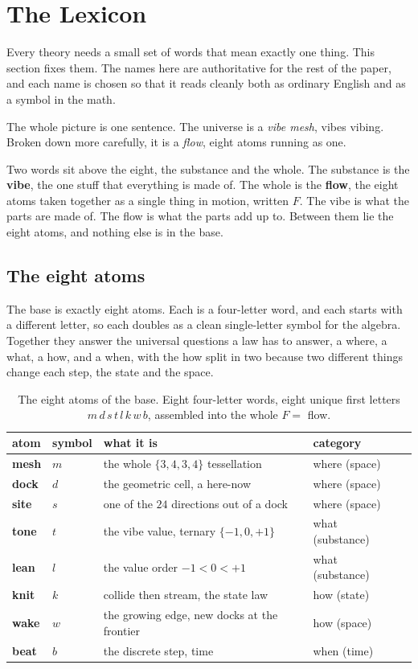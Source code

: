 \section{The Lexicon}

Every theory needs a small set of words that mean exactly one thing. This section fixes them. The names here are authoritative for the rest of the paper, and each name is chosen so that it reads cleanly both as ordinary English and as a symbol in the math.

The whole picture is one sentence. The universe is a \emph{vibe mesh}, vibes vibing. Broken down more carefully, it is a \emph{flow}, eight atoms running as one.

Two words sit above the eight, the substance and the whole. The substance is the \textbf{vibe}, the one stuff that everything is made of. The whole is the \textbf{flow}, the eight atoms taken together as a single thing in motion, written $F$. The vibe is what the parts are made of. The flow is what the parts add up to. Between them lie the eight atoms, and nothing else is in the base.

\subsection{The eight atoms}

The base is exactly eight atoms. Each is a four-letter word, and each starts with a different letter, so each doubles as a clean single-letter symbol for the algebra. Together they answer the universal questions a law has to answer, a where, a what, a how, and a when, with the how split in two because two different things change each step, the state and the space.

\begin{table}[ht]
\centering
\begin{tabular}{@{}lllll@{}}
\toprule
atom & symbol & what it is & category \\
\midrule
\textbf{mesh} & $m$ & the whole $\{3,4,3,4\}$ tessellation & where (space) \\
\textbf{dock} & $d$ & the geometric cell, a here-now & where (space) \\
\textbf{site} & $s$ & one of the $24$ directions out of a dock & where (space) \\
\textbf{tone} & $t$ & the vibe value, ternary $\{-1,0,+1\}$ & what (substance) \\
\textbf{lean} & $l$ & the value order $-1 < 0 < +1$ & what (substance) \\
\textbf{knit} & $k$ & collide then stream, the state law & how (state) \\
\textbf{wake} & $w$ & the growing edge, new docks at the frontier & how (space) \\
\textbf{beat} & $b$ & the discrete step, time & when (time) \\
\bottomrule
\end{tabular}
\caption{The eight atoms of the base. Eight four-letter words, eight unique first letters $m\,d\,s\,t\,l\,k\,w\,b$, assembled into the whole $F = $ flow.}
\label{tab:atoms}
\end{table}

